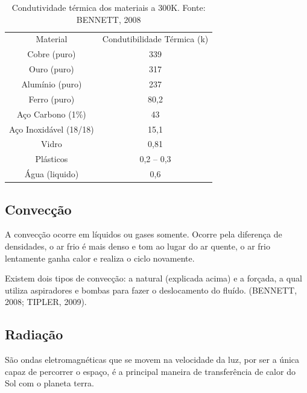 \begin{table}[H]
\centering
\begin{tabular}{|c|c|}
\cline{1-2}
Material               & Condutibilidade Térmica (k) \\ \cline{1-2}
Cobre (puro)           & 339                         \\ \cline{1-2}
Ouro (puro)            & 317                         \\ \cline{1-2}
Alumínio (puro)        & 237                         \\ \cline{1-2}
Ferro (puro)           & 80,2                        \\ \cline{1-2}
Aço Carbono (1\%)      & 43                          \\ \cline{1-2}
Aço Inoxidável (18/18) & 15,1                        \\ \cline{1-2}
Vidro                  & 0,81                        \\ \cline{1-2}
Plásticos              & 0,2 -- 0,3                  \\ \cline{1-2}
Água (liquido)         & 0,6                         \\ \cline{1-2}

\end{tabular}
\caption{Condutividade térmica dos materiais a 300K. Fonte: BENNETT, 2008}
\label{condutividade térmica}
\end{table}

\subsection{Convecção}

A convecção ocorre em líquidos ou gases somente. Ocorre pela diferença de densidades, o ar frio é mais denso e tom ao lugar do ar quente, o ar frio lentamente ganha calor e realiza o ciclo novamente.

Existem dois tipos de convecção: a natural (explicada acima) e a forçada, a qual utiliza aspiradores e bombas para fazer o deslocamento do fluído. (BENNETT, 2008; TIPLER, 2009).

\subsection{Radiação}

São ondas eletromagnéticas que se movem na velocidade da luz, por ser a única capaz de percorrer o espaço, é a principal maneira de transferência de calor do Sol com o planeta terra.

